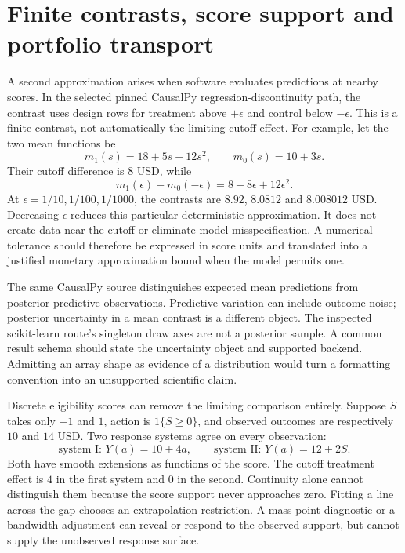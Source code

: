 \section{Finite contrasts, score support and portfolio transport}
\label{exec17:s4-support}

A second approximation arises when software evaluates predictions at nearby
scores. In the selected pinned CausalPy regression-discontinuity path, the
contrast uses design rows for treatment above $+\epsilon$ and control below
$-\epsilon$. This is a finite contrast, not automatically the limiting
cutoff effect. For example, let the two mean functions be
\[
 m_1(s)=18+5s+12s^2,\qquad m_0(s)=10+3s.
\]
Their cutoff difference is $8$ USD, while
\[
 m_1(\epsilon)-m_0(-\epsilon)=8+8\epsilon+12\epsilon^2.
\]
At $\epsilon=1/10,1/100,1/1000$, the contrasts are $8.92$, $8.0812$ and
$8.008012$ USD. Decreasing $\epsilon$ reduces this particular deterministic
approximation. It does not create data near the cutoff or eliminate model
misspecification. A numerical tolerance should therefore be expressed in
score units and translated into a justified monetary approximation bound
when the model permits one.~\citep{exec14_causalpy_primary,exec17_s4_math}

The same CausalPy source distinguishes expected mean predictions from
posterior predictive observations. Predictive variation can include outcome
noise; posterior uncertainty in a mean contrast is a different object.
The inspected scikit-learn route's singleton draw axes are not a posterior
sample. A common result schema should state the uncertainty object and
supported backend. Admitting an array shape as evidence of a distribution
would turn a formatting convention into an unsupported scientific claim.
\citep{exec14_causalpy_primary,exec17_s4_paths}

Discrete eligibility scores can remove the limiting comparison entirely.
Suppose $S$ takes only $-1$ and $1$, action is $1\{S\geq0\}$, and observed
outcomes are respectively $10$ and $14$ USD. Two response systems agree on
every observation:
\[
 \text{system I: }Y(a)=10+4a,\qquad
 \text{system II: }Y(a)=12+2S.
\]
Both have smooth extensions as functions of the score. The cutoff treatment
effect is $4$ in the first system and $0$ in the second. Continuity alone
cannot distinguish them because the score support never approaches zero.
Fitting a line across the gap chooses an extrapolation restriction. A
mass-point diagnostic or a bandwidth adjustment can reveal or respond to
the observed support, but cannot supply the unobserved response surface.
\citep{exec17_s4_math}

